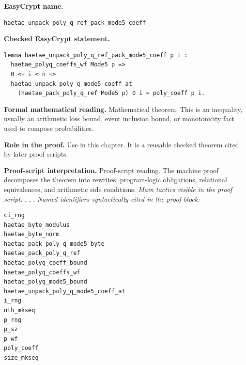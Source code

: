 \begin{formaltheorem}
\noindent\textbf{EasyCrypt name.}
\begin{lstlisting}[language=EasyCrypt,basicstyle=\ttfamily\scriptsize]
haetae_unpack_poly_q_ref_pack_mode5_coeff
\end{lstlisting}
\noindent\textbf{Checked EasyCrypt statement.}
\begin{lstlisting}[language=EasyCrypt,basicstyle=\ttfamily\scriptsize]
lemma haetae_unpack_poly_q_ref_pack_mode5_coeff p i :
  haetae_polyq_coeffs_wf Mode5 p =>
  0 <= i < n =>
  haetae_unpack_poly_q_mode5_coeff_at
    (haetae_pack_poly_q_ref Mode5 p) 0 i = poly_coeff p i.
\end{lstlisting}
\noindent\textbf{Formal mathematical reading.}
Mathematical theorem. This is an inequality, usually an arithmetic loss bound, event inclusion bound, or monotonicity fact used to compose probabilities.

\noindent\textbf{Role in the proof.}
Use in this chapter. It is a reusable checked theorem cited by later proof scripts.

\noindent\textbf{Proof-script interpretation.}
Proof-script reading. The machine proof decomposes the theorem into rewrites, program-logic obligations, relational equivalences, and arithmetic side conditions.
\emph{Main tactics visible in the proof script:} , , .
\emph{Named identifiers syntactically cited in the proof block:}
\begin{lstlisting}[language=EasyCrypt,basicstyle=\ttfamily\scriptsize]
ci_rng
haetae_byte_modulus
haetae_byte_norm
haetae_pack_poly_q_mode5_byte
haetae_pack_poly_q_ref
haetae_polyq_coeff_bound
haetae_polyq_coeffs_wf
haetae_polyq_mode5_bound
haetae_unpack_poly_q_mode5_coeff_at
i_rng
nth_mkseq
p_rng
p_sz
p_wf
poly_coeff
size_mkseq
\end{lstlisting}

\end{formaltheorem}

